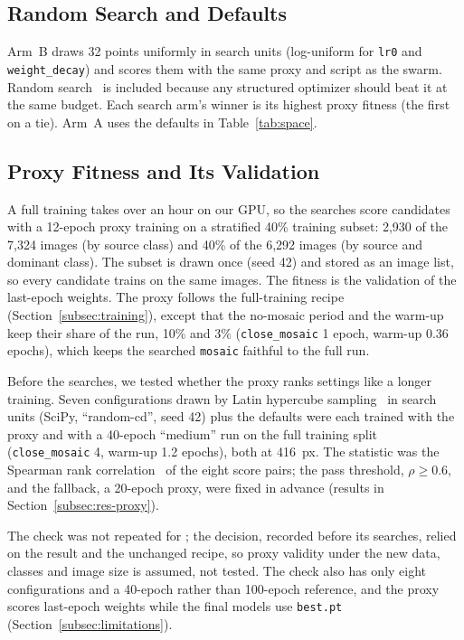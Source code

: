 \subsection{Random Search and Defaults}
\label{subsec:random}

Arm~B draws 32 points uniformly in search units (log-uniform for \texttt{lr0} and \texttt{weight\_decay}) and scores them with the same proxy and script as the swarm. Random search~\cite{bergstra2012random} is included because any structured optimizer should beat it at the same budget. Each search arm's winner is its highest proxy fitness (the first on a tie). Arm~A uses the defaults in Table~\ref{tab:space}.

\subsection{Proxy Fitness and Its Validation}
\label{subsec:proxy}

A full training takes over an hour on our GPU, so the searches score candidates with a 12-epoch proxy training on a stratified 40\% training subset: 2,930 of the 7,324 \genone images (by source class) and 40\% of the 6,292 \gentwo images (by source and dominant class). The subset is drawn once (seed 42) and stored as an image list, so every candidate trains on the same images. The fitness is the validation \mapfifty of the last-epoch weights. The proxy follows the full-training recipe (Section~\ref{subsec:training}), except that the no-mosaic period and the warm-up keep their share of the run, 10\% and 3\% (\texttt{close\_mosaic} 1 epoch, warm-up 0.36 epochs), which keeps the searched \texttt{mosaic} faithful to the full run.

Before the \genone searches, we tested whether the proxy ranks settings like a longer training. Seven configurations drawn by Latin hypercube sampling~\cite{mckay1979comparison} in search units (SciPy, ``random-cd'', seed 42) plus the defaults were each trained with the proxy and with a 40-epoch ``medium'' run on the full training split (\texttt{close\_mosaic} 4, warm-up 1.2 epochs), both at 416~px. The statistic was the Spearman rank correlation~\cite{spearman1904proof} of the eight score pairs; the pass threshold, $\rho \ge 0.6$, and the fallback, a 20-epoch proxy, were fixed in advance (results in Section~\ref{subsec:res-proxy}).

The check was not repeated for \gentwo; the decision, recorded before its searches, relied on the \genone result and the unchanged recipe, so proxy validity under the new data, classes and image size is assumed, not tested. The check also has only eight configurations and a 40-epoch rather than 100-epoch reference, and the proxy scores last-epoch weights while the final models use \texttt{best.pt} (Section~\ref{subsec:limitations}).

